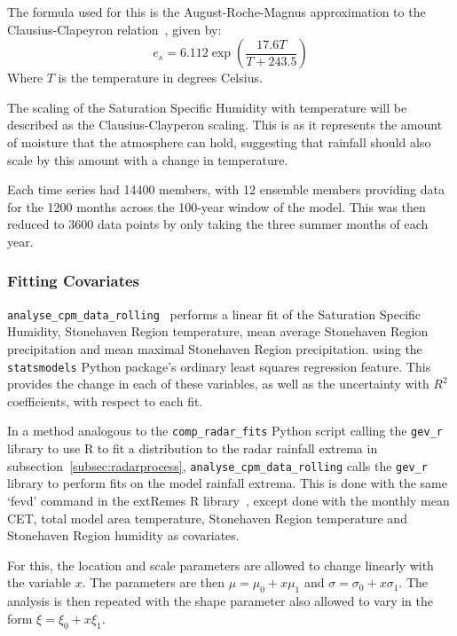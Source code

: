 The formula used for this is the August-Roche-Magnus approximation to the Clausius-Clapeyron relation~\cite{Alduchov_Eskridge_1996}, given by:
\begin{equation}\label{eq:qsat}
    e_s = 6.112 \exp\left( \frac{17.6 T}{T + 243.5} \right)
\end{equation}
Where $T$ is the temperature in degrees Celsius.

The scaling of the Saturation Specific Humidity with temperature will be described as the Clausius-Clayperon scaling.
This is as it represents the amount of moisture that the atmosphere can hold,
    suggesting that rainfall should also scale by this amount with a change in temperature.

Each time series had 14400 members,
    with 12 ensemble members providing data for the 1200 months across the 100-year window of the model.
This was then reduced to 3600 data points by only taking the three summer months of each year.

\subsubsection{Fitting Covariates}

\texttt{analyse\_cpm\_data\_rolling}~\cite{Me_Code} performs a linear fit of the Saturation Specific Humidity,
    Stonehaven Region temperature, mean average Stonehaven Region precipitation and mean maximal Stonehaven Region precipitation.
    using the \texttt{statsmodels} Python package's ordinary least squares regression feature.
This provides the change in each of these variables, as well as the uncertainty with $R^2$ coefficients,
    with respect to each fit.

In a method analogous to the \texttt{comp\_radar\_fits} Python script calling the \texttt{gev\_r} library to use R to fit
    a distribution to the radar rainfall extrema in subsection~\ref{subsec:radarprocess},
    \texttt{analyse\_cpm\_data\_rolling} calls the \texttt{gev\_r} library to perform fits on the model rainfall extrema.
This is done with the same `fevd' command in the extRemes R library~\cite{extremes_R},
    except done with the monthly mean CET, total model area temperature, Stonehaven Region temperature and Stonehaven Region humidity as covariates.

For this,
    the location and scale parameters are allowed to change linearly with the variable $x$.
The parameters are then $\mu = \mu_0 + x\mu_1$ and $\sigma = \sigma_0 + x\sigma_1$.
The analysis is then repeated with the shape parameter also allowed to vary in the form $\xi = \xi_0 + x\xi_1$.


